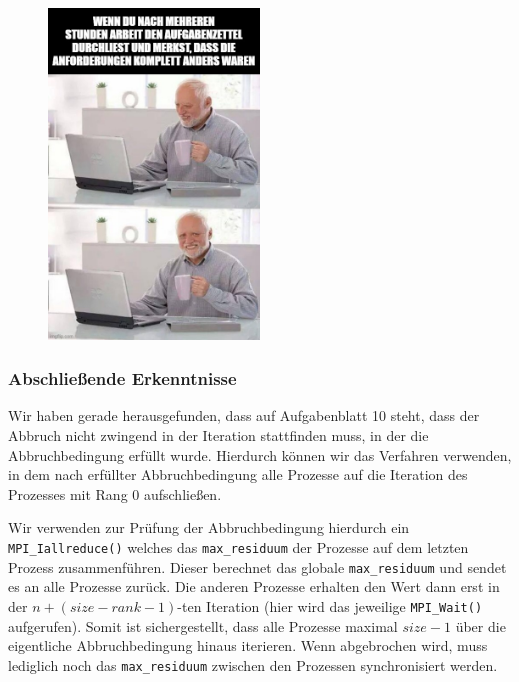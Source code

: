 \documentclass[12pt]{article}
\begin{document}
\begin{sloppypar}
\newpage

\begin{figure}[ht]
    \centering
    \includegraphics[width=0.5\textwidth]{res/weeky-meme.png}
\end{figure}

\subsubsection{Abschließende Erkenntnisse}
Wir haben gerade herausgefunden, dass auf Aufgabenblatt 10 steht, dass der Abbruch nicht zwingend in der Iteration stattfinden muss, in der die Abbruchbedingung erfüllt wurde. Hierdurch können wir das Verfahren verwenden, in dem nach erfüllter Abbruchbedingung alle Prozesse auf die Iteration des Prozesses mit Rang 0 aufschließen.

\vspace*{1em}

Wir verwenden zur Prüfung der Abbruchbedingung hierdurch ein \verb|MPI_Iallreduce()| welches das \verb|max_residuum| der Prozesse auf dem letzten Prozess zusammenführen. Dieser berechnet das globale \verb|max_residuum| und sendet es an alle Prozesse zurück. Die anderen Prozesse erhalten den Wert dann erst in der $n + (size-rank-1)$-ten Iteration (hier wird das jeweilige \verb|MPI_Wait()| aufgerufen). Somit ist sichergestellt, dass alle Prozesse maximal $size-1$ über die eigentliche Abbruchbedingung hinaus iterieren. Wenn abgebrochen wird, muss lediglich noch das \verb|max_residuum| zwischen den Prozessen synchronisiert werden.

\end{sloppypar}
\end{document}
